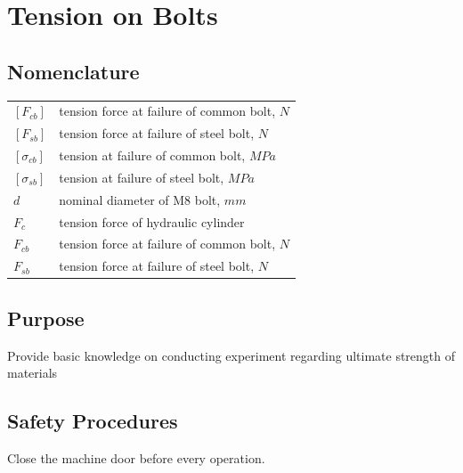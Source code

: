 \chapter{Tension on Bolts}
\section{Nomenclature}
\begin{tabular}[t]{lp{8cm}}
		$ [F_{cb}] $ & tension force at failure of common bolt, $ N $\\
		$ [F_{sb}] $ & tension force at failure of steel bolt, $ N $\\
		$ [\sigma_{cb}] $ & tension at failure of common bolt, $ MPa $\\
		$ [\sigma_{sb}] $ & tension at failure of steel bolt, $ MPa $\\
		$ d $ & nominal diameter of M8 bolt, $ mm $\\
		$ F_c $ & tension force of hydraulic cylinder\\
		$ F_{cb} $ & tension force at failure of common bolt, $ N $\\
		$ F_{sb} $ & tension force at failure of steel bolt, $ N $\\
\end{tabular}

\section{Purpose}
Provide basic knowledge on conducting experiment regarding ultimate strength of materials

\section{Safety Procedures}
Close the machine door before every operation.

